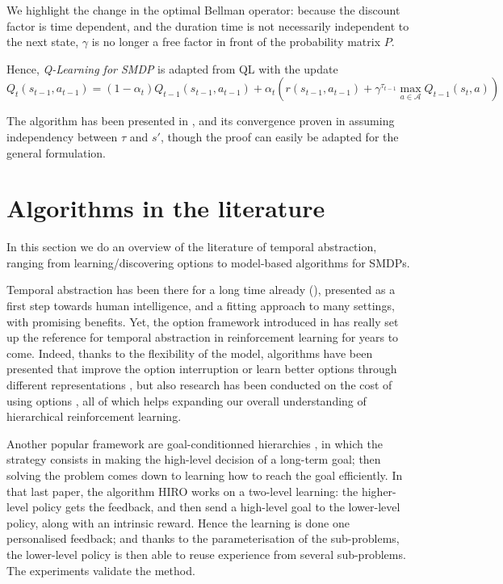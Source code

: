 We highlight the change in the optimal Bellman operator: because the discount factor is time dependent, and the duration time is not necessarily independent to the next state, $\gamma$ is no longer a free factor in front of the probability matrix $P$.

Hence, \emph{Q-Learning for SMDP} is adapted from QL with the update $$Q_t(s_{t-1}, a_{t-1}) = (1 - \alpha_t)Q_{t-1}(s_{t-1}, a_{t-1}) + \alpha_t \left(r(s_{t-1}, a_{t-1}) + \gamma^{\tau_{t-1}} \max_{a\in \mathcal{A}} Q_{t-1} (s_t, a)\right)$$

The algorithm has been presented in \citep{bradtke_reinforcement_1994}, and its convergence proven in \citep{parr_hierarchical_1998} assuming independency between $\tau$ and $s'$, though the proof can easily be adapted for the general formulation.


\section{Algorithms in the literature}

In this section we do an overview of the literature of temporal abstraction, ranging from learning/discovering options to model-based algorithms for SMDPs.

Temporal abstraction has been there for a long time already (\cite{parr_hierarchical_1998, fikes_learning_1972}), presented as a first step towards human intelligence, and a fitting approach to many settings, with promising benefits. Yet, the option framework introduced in \citep{sutton_between_1999} has really set up the reference for temporal abstraction in reinforcement learning for years to come. Indeed, thanks to the flexibility of the model, algorithms have been presented that improve the option interruption \citep{mann_time-regularized_2014} or learn better options through different representations \citep{bacon_option-critic_2016, machado_temporal_2021, sorg_linear_2010}, but also research has been conducted on the cost of using options \citep{solway_optimal_2014, botvinick_hierarchically_2009}, all of which helps expanding our overall understanding of hierarchical reinforcement learning.

Another popular framework are goal-conditionned hierarchies \citep{nachum_data-efficient_2018}, in which the strategy consists in making the high-level decision of a long-term goal; then solving the problem comes down to learning how to reach the goal efficiently. In that last paper, the algorithm HIRO works on a two-level learning: the higher-level policy gets the feedback, and then send a high-level goal to the lower-level policy, along with an intrinsic reward. Hence the learning is done one personalised feedback; and thanks to the parameterisation of the sub-problems, the lower-level policy is then able to reuse experience from several sub-problems. The experiments validate the method.

